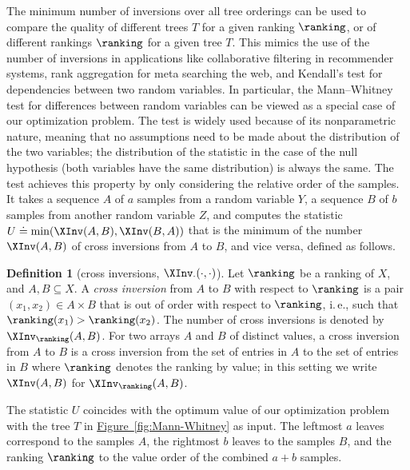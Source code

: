 \documentclass[11pt]{article}
\numberwithin{equation}{section}
\theoremstyle{definition}
\newtheorem{definition}[theorem]{Definition}
\theoremstyle{plain}
\newcommand{\ie}{i.\,e.}
\newcommand{\expref}[2]{\hyperref[#2]{#1~\ref{#2}}}
\begin{document}
The minimum number of inversions over all tree orderings %
%
can be used to compare the quality of different trees $T$ for a given ranking $\ranking$, or of different rankings $\ranking$ for a given tree $T$. This mimics the use of the number of inversions in applications like collaborative filtering in recommender systems, rank aggregation for meta searching the web, and Kendall's test for dependencies between two random variables. 
In particular, the Mann--Whitney test for differences between random variables can be viewed as a special case of our optimization problem. The test is widely used because of its nonparametric nature, meaning that no assumptions need to be made about the distribution of the two variables; the distribution of the statistic in the case of the null hypothesis (both variables have the same distribution) is always the same. The test achieves this property by only considering the relative order of the samples. It takes a sequence $A$ of $a$ samples from a random variable $Y$, a sequence $B$ of $b$ samples from another random variable $Z$, and computes the statistic $U \doteq \min(\XInv(A,B),\XInv(B,A))$ that is the minimum of the number $\XInv(A,B)$ of cross inversions from $A$ to $B$, and vice versa, defined as follows.  %
%
\begin{definition}[cross inversions, $\XInv_{\cdot}(\cdot,\cdot)$]
Let $\ranking$ be a ranking of $X$, and $A, B \subseteq X$. A \emph{cross inversion} from $A$ to $B$ with respect to $\ranking$ is a pair $(x_1,x_2) \in A \times B$ that is out of order with respect to $\ranking$, \ie, such that $\ranking(x_1) > \ranking(x_2)$. The number of cross inversions is denoted by $\XInv_\ranking(A,B)$.
For two arrays $A$ and $B$ of
%
%
distinct values, a cross inversion from $A$ to $B$ is a cross inversion from the set of entries in $A$ to the set of entries in $B$ where $\ranking$ denotes the ranking by value; in this setting we write $\XInv(A,B)$ for $\XInv_\ranking(A,B)$.
\end{definition}
The statistic $U$ coincides with the optimum value of our optimization problem with the tree $T$ in \expref{Figure}{fig:Mann-Whitney} as input. The leftmost $a$ leaves correspond to the samples $A$, the rightmost $b$ leaves to the samples $B$, and the ranking $\ranking$ to the value order of the combined $a+b$ samples.
\end{document}
